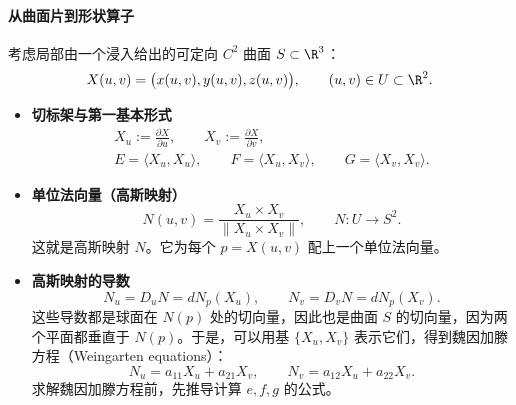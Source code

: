 \paragraph{从曲面片到形状算子}
考虑局部由一个浸入给出的可定向 $C^2$ 曲面 $S\subset\R^3$：
\[
  X(u,v)=\bigl(x(u,v),y(u,v),z(u,v)\bigr),\qquad (u,v)\in U\subset\R^2.
\]
\begin{itemize}
  \item \textbf{切标架与第一基本形式}
  \[
    \begin{gathered}
      X_u:=\frac{\partial X}{\partial u},\qquad
      X_v:=\frac{\partial X}{\partial v},\\
      E=\langle X_u,X_u\rangle,\qquad
      F=\langle X_u,X_v\rangle,\qquad
      G=\langle X_v,X_v\rangle.
    \end{gathered}
  \]
  \item \textbf{单位法向量（高斯映射）}
  \[
    N(u,v)=\frac{X_u\times X_v}{\lVert X_u\times X_v\rVert},
    \qquad N\colon U\to S^2.
  \]
  这就是高斯映射 $N$。它为每个 $p=X(u,v)$ 配上一个单位法向量。
  \item \textbf{高斯映射的导数}
  \[
    N_u=D_uN=dN_p(X_u),\qquad N_v=D_vN=dN_p(X_v).
  \]
  这些导数都是球面在 $N(p)$ 处的切向量，因此也是曲面 $S$ 的切向量，因为两个平面都垂直于 $N(p)$。于是，可以用基 $\{X_u,X_v\}$ 表示它们，得到魏因加滕方程（Weingarten equations）：
  \[
    N_u=a_{11}X_u+a_{21}X_v,\qquad
    N_v=a_{12}X_u+a_{22}X_v.
  \]
  求解魏因加滕方程前，先推导计算 $e,f,g$ 的公式。


\end{itemize}
